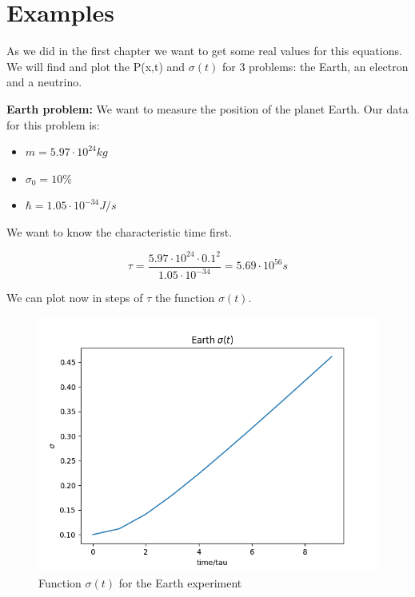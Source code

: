 \section{Examples}

As we did in the first chapter we want to get some real values for this equations. We will find and plot the P(x,t) and $\sigma(t)$ for 3 problems: the Earth, an electron and a neutrino.

\textbf{Earth problem: } We want to measure the position of the planet Earth. Our data for this problem is:

\begin{itemize}
    \item $m = 5.97 \cdot 10^{24} kg$
    \item $ \sigma_0 = 10\% $
    \item $\hbar = 1.05 \cdot 10^{-34} J/s$
\end{itemize}

We want to know the characteristic time first.

\begin{equation}
    \label{2.39}
    \tau = \frac{5.97\cdot 10^{24}\cdot 0.1^2}{1.05 \cdot 10^{-34}} = 5.69 \cdot 10^{56} s
\end{equation}

We can plot now in steps of $\tau$ the function $\sigma(t)$.

\begin{figure}[H]
    \centering
    \includegraphics{images2/Earth/sigma.png}
    \caption{Function $\sigma(t)$ for the Earth experiment}
    \label{fig:sigma_earth}
\end{figure}

